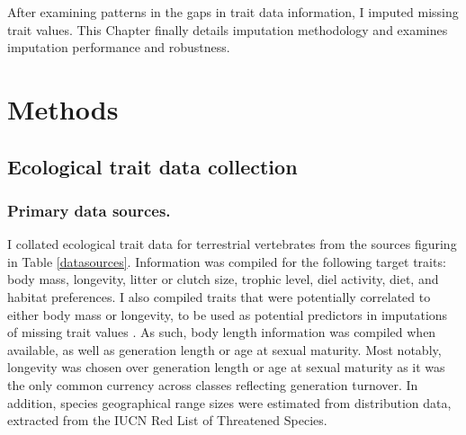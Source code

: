 After examining patterns in the gaps in trait data information, I imputed missing trait values. This Chapter finally details imputation methodology and examines imputation performance and robustness.



\section{Methods}

\subsection{Ecological trait data collection}

\subsubsection{Primary data sources.}
I collated ecological trait data for terrestrial vertebrates from the sources figuring in Table \ref{datasources}. Information was compiled for the following target traits: body mass, longevity, litter or clutch size, trophic level, diel activity, diet, and habitat preferences. I also compiled traits that were potentially correlated to either body mass or longevity, to be used as potential predictors in imputations of missing trait values \citep{Meiri2010,Christiansen1999,AnAge}. As such, body length information was compiled when available, as well as generation length or age at sexual maturity. Most notably, longevity was chosen over generation length or age at sexual maturity as it was the only common currency across classes reflecting generation turnover. In addition, species geographical range sizes were estimated from distribution data, extracted from the IUCN Red List of Threatened Species.

